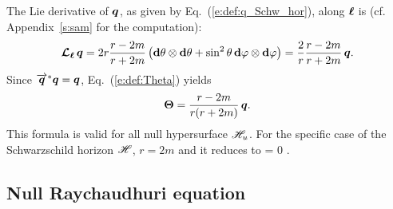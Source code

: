{{\begin{example} \label{x:def:Schw_hor8}
The Lie derivative of $\bm{q}$, as given by Eq.~(\ref{e:def:q_Schw_hor}),
along $\bm{\ell}$ is (cf. Appendix~\ref{s:sam} for the computation):
\[
    \bm{\mathcal{L}}_{\bm{\bm{\ell}}}\, \bm{q} =  2 r \frac{r-2m}{r+2m} \left( \mathbf{d}\theta \otimes \mathbf{d}\theta
        +  \sin^2\theta \, \mathbf{d}\varphi \otimes \mathbf{d}\varphi \right) = \frac{2}{r} \frac{r-2m}{r+2m}
            \, \bm{q} .
\]
Since $\overrightarrow{\bm{q}}^* \bm{q} = \bm{q}$, Eq.~(\ref{e:def:Theta}) yields
\[
    \bm{\Theta} = \frac{r-2m}{r(r+2m)} \, \bm{q} .
\]
This formula is valid for all null hypersurface $\mathscr{H}_u$. For the specific
case of the Schwarzschild horizon $\mathscr{H}$, $r=2m$ and it reduces to
\be \label{e:def:Theta_zero_Schw_hor}
    \w{\Theta} = 0 .
\ee
\end{example}

\subsection{Null Raychaudhuri equation}

}}
